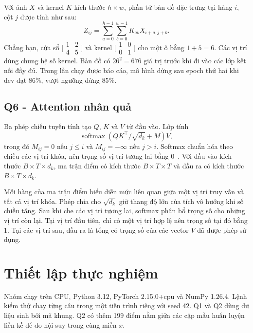 \documentclass[conference]{IEEEtran}
\begin{document}
Với ảnh \(X\) và kernel \(K\) kích thước \(h\times w\), phần tử bản đồ đặc trưng tại hàng \(i\), cột \(j\) được tính như sau:
\[
Z_{ij}=\sum_{a=0}^{h-1}\sum_{b=0}^{w-1}K_{ab}X_{i+a,j+b}.
\]
Chẳng hạn, cửa sổ \(\bigl[\begin{smallmatrix}1&2\\4&5\end{smallmatrix}\bigr]\) và kernel \(\bigl[\begin{smallmatrix}1&0\\0&1\end{smallmatrix}\bigr]\) cho một ô bằng \(1+5=6\). Các vị trí dùng chung hệ số kernel. Bản đồ có \(26^2=676\) giá trị trước khi đi vào các lớp kết nối đầy đủ. Trong lần chạy được báo cáo, mô hình dừng sau epoch thứ hai khi dev đạt 86\%, vượt ngưỡng dừng 85\%.

\subsection{Q6 - Attention nhân quả}
Ba phép chiếu tuyến tính tạo \(Q\), \(K\) và \(V\) từ đầu vào. Lớp tính
\[
\operatorname{softmax}\!\left(QK^\top/\sqrt{d_k}+M\right)V,
\]
trong đó \(M_{ij}=0\) nếu \(j\le i\) và \(M_{ij}=-\infty\) nếu \(j>i\). Softmax chuẩn hóa theo chiều các vị trí khóa, nên trọng số vị trí tương lai bằng 0~\cite{attention}. Với đầu vào kích thước \(B\times T\times d_k\), ma trận điểm có kích thước \(B\times T\times T\) và đầu ra có kích thước \(B\times T\times d_k\).

Mỗi hàng của ma trận điểm biểu diễn mức liên quan giữa một vị trí truy vấn và tất cả vị trí khóa. Phép chia cho \(\sqrt{d_k}\) giữ thang độ lớn của tích vô hướng khi số chiều tăng. Sau khi che các vị trí tương lai, softmax phân bổ trọng số cho những vị trí còn lại. Tại vị trí đầu tiên, chỉ có một vị trí hợp lệ nên trọng số tại đó bằng 1. Tại các vị trí sau, đầu ra là tổng có trọng số của các vector \(V\) đã được phép sử dụng.

\section{Thiết lập thực nghiệm}
Nhóm chạy trên CPU, Python 3.12, PyTorch 2.15.0+cpu và NumPy 1.26.4. Lệnh kiểm thử chạy từng câu trong một tiến trình riêng với seed 42. Q1 và Q2 dùng dữ liệu sinh bởi mã khung. Q2 có thêm 199 điểm nằm giữa các cặp mẫu huấn luyện liền kề để đo nội suy trong cùng miền \(x\).
\end{document}
